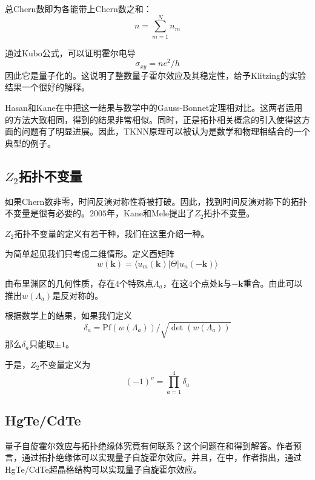 总Chern数即为各能带上Chern数之和：
\begin{equation}
    n=\sum_{m=1}^N n_m
\end{equation}

通过Kubo公式，可以证明霍尔电导
\begin{equation}
    \sigma_{xy}=ne^2/h
\end{equation}
因此它是量子化的。这说明了整数量子霍尔效应及其稳定性，给予Klitzing的实验结果一个很好的解释。

Hasan和Kane在\cite{RN27}中把这一结果与数学中的Gauss-Bonnet定理相对比。这两者运用的方法大致相同，得到的结果非常相似。同时，正是拓扑相关概念的引入使得这方面的问题有了明显进展。因此，TKNN原理可以被认为是数学和物理相结合的一个典型的例子。

\subsection{$Z_2$拓扑不变量}

如果Chern数非零，时间反演对称性将被打破。因此，找到时间反演对称下的拓扑不变量是很有必要的。$2005$年，Kane和Mele提出了$Z_2$拓扑不变量\cite{RN28}。

$Z_2$拓扑不变量的定义有若干种，我们在这里介绍一种\cite{RN29}。

为简单起见我们只考虑二维情形。定义酉矩阵
\begin{equation}
    w(\mathbf{k})=\langle u_m(\mathbf{k})|\Theta|u_n(-\mathbf{k})\rangle
\end{equation}

由布里渊区的几何性质，存在$4$个特殊点$\Lambda_a$，在这$4$个点处$\mathbf{k}$与$-\mathbf{k}$重合。由此可以推出$w(\Lambda_a)$是反对称的。

根据数学上的结果，如果我们定义
\begin{equation}
    \delta_a=\mathrm{Pf}(w(\Lambda_a))/\sqrt{\det(w(\Lambda_a))}
\end{equation}
那么$\delta_a$只能取$\pm1$。

于是，$Z_2$不变量定义为
\begin{equation}
    (-1)^v=\prod_{a=1}^{4}\delta_a
\end{equation}

\subsection{HgTe/CdTe}

量子自旋霍尔效应与拓扑绝缘体究竟有何联系？这个问题在\cite{RN28}和\cite{RN34}得到解答。作者预言，通过拓扑绝缘体可以实现量子自旋霍尔效应。并且，在\cite{RN34}中，作者指出，通过HgTe/CdTe超晶格结构可以实现量子自旋霍尔效应。

